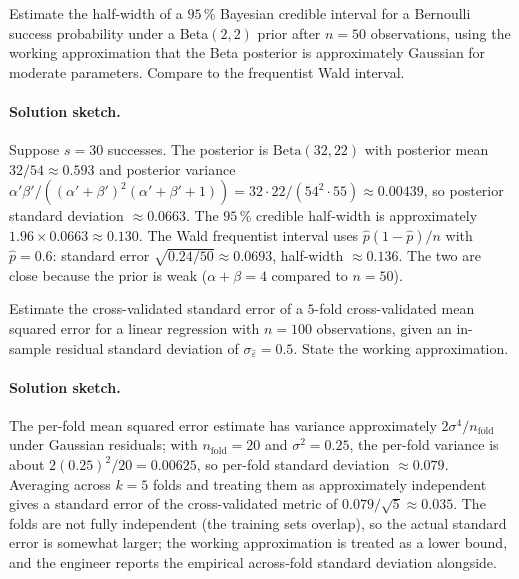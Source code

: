 \begin{exercise}
Estimate the half-width of a $95\,\%$ Bayesian credible interval
for a Bernoulli success probability under a Beta$(2, 2)$ prior
after $n = 50$ observations, using the working approximation that
the Beta posterior is approximately Gaussian for moderate
parameters. Compare to the frequentist Wald interval.

\paragraph{Solution sketch.} Suppose $s = 30$ successes. The
posterior is $\mathrm{Beta}(32, 22)$ with posterior mean $32/54
\approx 0.593$ and posterior variance $\alpha'\beta'/((\alpha' +
\beta')^{2}(\alpha' + \beta' + 1)) = 32 \cdot 22 / (54^{2} \cdot
55) \approx 0.00439$, so posterior standard deviation $\approx
0.0663$. The $95\,\%$ credible half-width is approximately
$1.96 \times 0.0663 \approx 0.130$. The Wald frequentist interval
uses $\hat{p}(1-\hat{p})/n$ with $\hat{p} = 0.6$: standard error
$\sqrt{0.24/50} \approx 0.0693$, half-width $\approx 0.136$.
The two are close because the prior is weak ($\alpha + \beta = 4$
compared to $n = 50$).
\end{exercise}

\begin{exercise}
Estimate the cross-validated standard error of a $5$-fold
cross-validated mean squared error for a linear regression with
$n = 100$ observations, given an in-sample residual standard
deviation of $\sigma_{\hat{\varepsilon}} = 0.5$. State the working
approximation.

\paragraph{Solution sketch.} The per-fold mean squared error
estimate has variance approximately $2\sigma^{4}/n_{\mathrm{fold}}$
under Gaussian residuals; with $n_{\mathrm{fold}} = 20$ and
$\sigma^{2} = 0.25$, the per-fold variance is about $2(0.25)^{2}/
20 = 0.00625$, so per-fold standard deviation $\approx 0.079$.
Averaging across $k = 5$ folds and treating them as approximately
independent gives a standard error of the cross-validated metric
of $0.079/\sqrt{5} \approx 0.035$. The folds are not fully
independent (the training sets overlap), so the actual standard
error is somewhat larger; the working approximation is treated
as a lower bound, and the engineer reports the empirical
across-fold standard deviation alongside.
\end{exercise}

